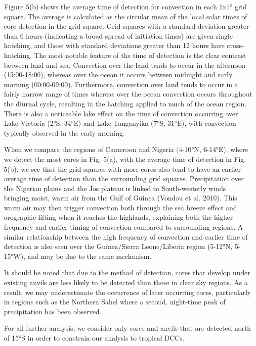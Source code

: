 Figure 5(b) shows the average time of detection for convection in each
1x1° grid square. The average is calculated as the circular mean of the
local solar times of core detection in the grid square. Grid squares
with a standard deviation greater than 6 hours (indicating a broad
spread of initiation times) are given single hatching, and those with
standard deviations greater than 12 hours have cross-hatching. The most
notable feature of the time of detection is the clear contrast between
land and sea. Convection over the land tends to occur in the afternoon
(15:00-18:00), whereas over the ocean it occurs between midnight and
early morning (00:00-09:00). Furthermore, convection over land tends to
occur in a fairly narrow range of times whereas over the ocean
convection occurs throughout the diurnal cycle, resulting in the
hatching applied to much of the ocean region. There is also a noticeable
lake effect on the time of convection occurring over Lake Victoria (2°S,
34°E) and Lake Tanganyika (7°S, 31°E), with convection typically
observed in the early morning.

When we compare the regions of Cameroon and Nigeria (4-10°N, 6-14°E),
where we detect the most cores in Fig. 5(a), with the average time of
detection in Fig. 5(b), we see that the grid squares with more cores
also tend to have an earlier average time of detection than the
surrounding grid squares. Precipitation over the Nigerian plains and the
Jos plateau is linked to South-westerly winds bringing moist, warm air
from the Gulf of Guinea (Vondou et al. 2010). This warm air may then
trigger convection both through the sea breeze effect and orographic
lifting when it reaches the highlands, explaining both the higher
frequency and earlier timing of convection compared to surrounding
regions. A similar relationship between the high frequency of convection
and earlier time of detection is also seen over the Guinea/Sierra
Leone/Liberia region (5-12°N, 5-15°W), and may be due to the same
mechanism.

It should be noted that due to the method of detection, cores that
develop under existing anvils are less likely to be detected than those
in clear sky regions. As a result, we may underestimate the occurrence
of later occurring cores, particularly in regions such as the Northern
Sahel where a second, night-time peak of precipitation has been
observed.

For all further analysis, we consider only cores and anvils that are
detected north of 15°S in order to constrain our analysis to tropical
DCCs.

